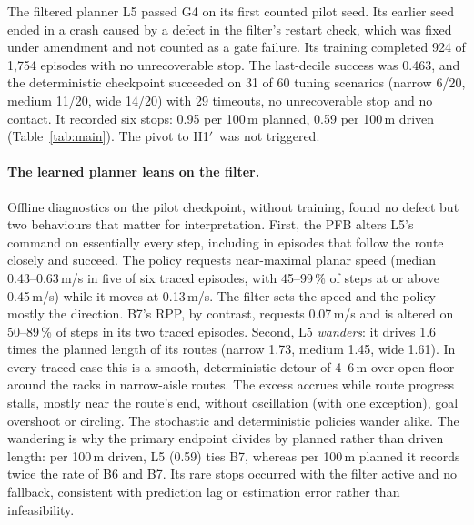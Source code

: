 \documentclass[11pt]{article}
\newcommand{\Hprime}{H1$'$}
\theoremstyle{definition}
\begin{document}
The filtered planner L5 passed G4 on its first counted pilot seed. Its earlier seed ended in a crash caused by a defect
in the filter's restart check, which was fixed under amendment and not counted as a gate failure. Its training completed
924 of 1{,}754 episodes with no unrecoverable stop. The last-decile success was 0.463, and the deterministic checkpoint
succeeded on 31 of 60 tuning scenarios (narrow 6/20, medium 11/20, wide 14/20) with 29 timeouts, no unrecoverable stop and
no contact. It recorded six stops: 0.95 per 100\,m planned, 0.59 per 100\,m driven (Table~\ref{tab:main}). The pivot to
\Hprime\ was not triggered.

\paragraph{The learned planner leans on the filter.} Offline diagnostics on the pilot checkpoint, without
training, found no defect but two behaviours that matter for interpretation. First, the PFB alters L5's
command on essentially every step, including in episodes that follow the route closely and succeed. The
policy requests near-maximal planar speed (median 0.43--0.63\,m/s in five of six traced episodes, with
45--99\,\% of steps at or above 0.45\,m/s) while it moves at 0.13\,m/s. The filter sets the speed and the
policy mostly the direction. B7's RPP, by contrast, requests 0.07\,m/s and is altered on 50--89\,\% of steps
in its two traced episodes. Second, L5 \emph{wanders}: it drives 1.6 times the planned length of its
routes (narrow 1.73, medium 1.45, wide 1.61). In every traced case this is a smooth, deterministic detour
of 4--6\,m over open floor around the racks in narrow-aisle routes. The excess accrues while route progress stalls,
mostly near the route's end, without oscillation (with one exception), goal overshoot or circling. The
stochastic and deterministic policies wander alike. The wandering is why the primary endpoint divides by
planned rather than driven length: per 100\,m driven, L5 (0.59) ties B7, whereas per 100\,m planned it
records twice the rate of B6 and B7. Its rare stops occurred with the filter active and no fallback,
consistent with prediction lag or estimation error rather than infeasibility.
\end{document}
